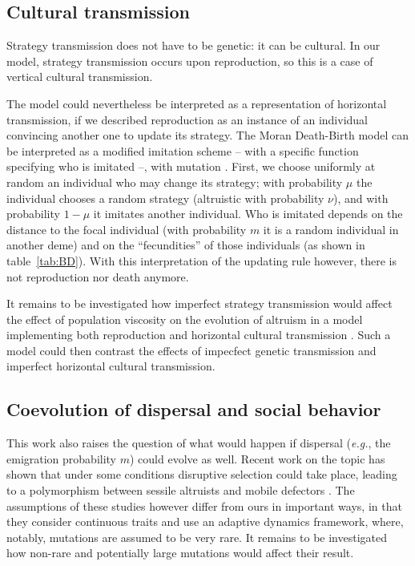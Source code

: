 \documentclass[11pt, letterpaper]{article}
\newcommand{\eg}{\textit{e.g.}}
\newcommand{\mutbias}{\nu}
\begin{document}
\subsection*{Cultural transmission}
Strategy transmission does not have to be genetic: it can be cultural. In our model, strategy transmission occurs upon reproduction, so this is a case of vertical cultural transmission. 

The model could nevertheless be interpreted as a representation of horizontal transmission, if we described reproduction as an instance of an individual convincing another one to update its strategy. The Moran Death-Birth model can be interpreted as a modified imitation scheme \citep{BoydRicherson2002, Ohtsuki2006} -- with a specific function specifying who is imitated --, with mutation \citep{Kandori1993}. First, we choose uniformly at random an individual who may change its strategy; with probability $\mu$ the individual chooses a random strategy (altruistic with probability $\mutbias$), and with probability $1-\mu$ it imitates another individual. Who is imitated depends on the distance to the focal individual (with probability $m$ it is a random individual in another deme) and on the ``fecundities'' of those individuals (as shown in table~\ref{tab:BD}). With this interpretation of the updating rule however, there is not reproduction nor death anymore. 

It remains to be investigated how imperfect strategy transmission would affect the effect of population viscosity on the evolution of altruism in a model implementing both reproduction and horizontal cultural transmission \citep[as in][]{Lehmann2008}. Such a model could then contrast the effects of impecfect genetic transmission and imperfect horizontal cultural transmission. 



\subsection*{Coevolution of dispersal and social behavior}
This work also raises the question of what would happen if dispersal (\eg, the emigration probability $m$) could evolve as well. Recent work on the topic has shown that under some conditions disruptive selection could take place, leading to a polymorphism between sessile altruists and mobile defectors \citep{Parvinen2013, MullonKL2017bioRxiv}. The assumptions of these studies however  differ from ours in important ways, in that they consider continuous traits and use an adaptive dynamics framework, where, notably, mutations are assumed to be very rare. It remains to be investigated how non-rare and potentially large mutations would affect their result. 
\end{document}
